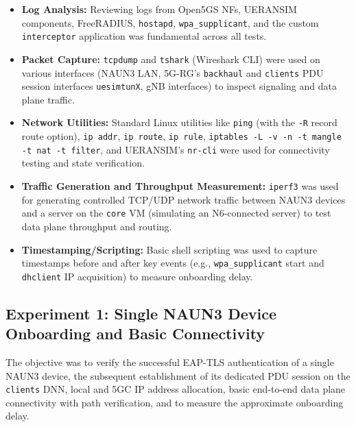 \begin{itemize}
    \item \textbf{Log Analysis:} Reviewing logs from Open5GS \acp{NF}, UERANSIM components, FreeRADIUS, \texttt{hostapd}, \texttt{wpa\_supplicant}, and the custom \texttt{interceptor} application was fundamental across all tests.

    \item \textbf{Packet Capture:} \texttt{tcpdump} and \texttt{tshark} (Wireshark \ac{CLI}) were used on various interfaces (\ac{NAUN3} \ac{LAN}, \ac{5G-RG}'s \texttt{backhaul} and \texttt{clients} \ac{PDU} session interfaces \texttt{uesimtunX}, \ac{gNB} interfaces) to inspect signaling and data plane traffic.

    \item \textbf{Network Utilities:} Standard Linux utilities like \texttt{ping} (with the \texttt{-R} record route option), \texttt{ip addr}, \texttt{ip route}, \texttt{ip rule}, \texttt{iptables -L -v -n -t mangle -t nat -t filter}, and UERANSIM's \texttt{nr-cli} were used for connectivity testing and state verification.

    \item \textbf{Traffic Generation and Throughput Measurement:} \texttt{iperf3} was used for generating controlled \ac{TCP}/\ac{UDP} network traffic between \ac{NAUN3} devices and a server on the \texttt{core} \ac{VM} (simulating an N6-connected server) to test data plane throughput and routing.

    \item \textbf{Timestamping/Scripting:} Basic shell scripting was used to capture timestamps before and after key events (e.g., \texttt{wpa\_supplicant} start and \texttt{dhclient} \ac{IP} acquisition) to measure onboarding delay.
\end{itemize}

\subsection{Experiment 1: Single \acs{NAUN3} Device Onboarding and Basic Connectivity}

The objective was to verify the successful \ac{EAP-TLS} authentication of a single \ac{NAUN3} device, the subsequent establishment of its dedicated \ac{PDU} session on the \texttt{clients} \ac{DNN}, local and \ac{5GC} \ac{IP} address allocation, basic end-to-end data plane connectivity with path verification, and to measure the approximate onboarding delay.

